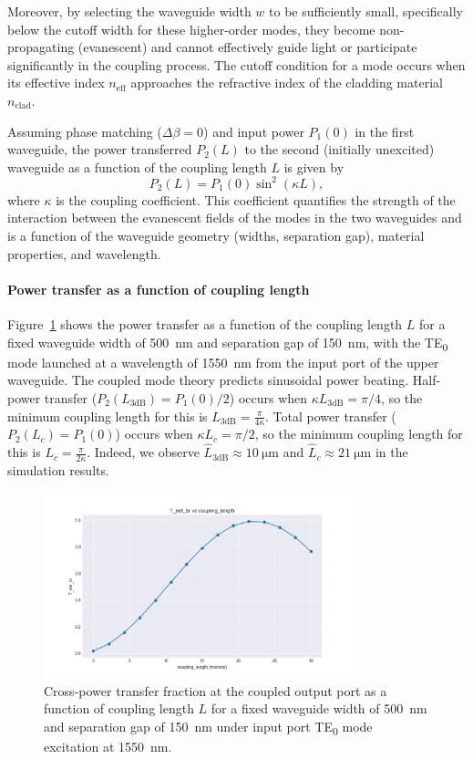 \documentclass[10pt, a4paper]{article}
\begin{document}
Moreover, by selecting the waveguide width \(w\) to be sufficiently small, specifically below the cutoff width for these higher-order modes, they become non-propagating (evanescent) and cannot effectively guide light or participate significantly in the coupling process.
The cutoff condition for a mode occurs when its effective index \(n_\text{eff}\) approaches the refractive index of the cladding material \(n_\text{clad}\).

Assuming phase matching (\(\Delta\beta=0\)) and input power \(P_1(0)\) in the first waveguide, the power transferred \(P_2(L)\) to the second (initially unexcited) waveguide as a function of the coupling length \(L\) is given by
\[
P_2(L) = P_1(0)\sin^2(\kappa L),
\]
where \(\kappa\) is the coupling coefficient. This coefficient quantifies the strength of the interaction between the evanescent fields of the modes in the two waveguides and is a function of the waveguide geometry (widths, separation gap), material properties, and wavelength.

\paragraph{Power transfer as a function of coupling length}
Figure~\ref{fig:coupling_length} shows the power transfer as a function of the coupling length \(L\) for a fixed waveguide width of \SI{500}{\nm} and separation gap of \SI{150}{\nm},
with the TE\textsubscript{0} mode launched at a wavelength of \SI{1550}{\nm} from the input port of the upper waveguide.
The coupled mode theory predicts sinusoidal power beating. Half-power transfer (\(P_2(L_{3\text{dB}}) = P_1(0)/2\)) occurs when \(\kappa L_{3\text{dB}} = \pi/4\), so the minimum coupling length for this is \(L_{3\text{dB}}=\frac{\pi}{4\kappa}\).
Total power transfer (\(P_2(L_c) = P_1(0)\)) occurs when \(\kappa L_c = \pi/2\), so the minimum coupling length for this is \(L_c=\frac{\pi}{2\kappa}\).
Indeed, we observe \(\hat{L}_{3\text{dB}}\approx\SI{10}{\um}\) and \(\hat{L}_c\approx\SI{21}{\um}\) in the simulation results.


\begin{figure}[h!]
  \centering
  \includegraphics[width=0.8\textwidth]{task3/sweep_plots/sweep_idx_0_sweep__coupling_length=0_30_15_T_net_br_line.png}
  \caption{Cross-power transfer fraction at the coupled output port as a function of coupling length \(L\) for a fixed waveguide width of \SI{500}{\nm} and separation gap of \SI{150}{\nm} under input port TE\textsubscript{0} mode excitation at \SI{1550}{\nm}.}
  \label{fig:coupling_length}
\end{figure}
\end{document}
